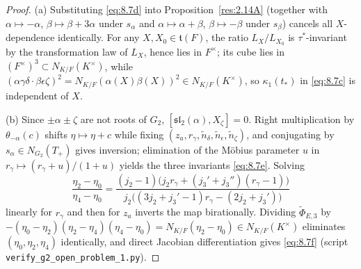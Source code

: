 \documentclass[12pt,letterpaper]{amsart}
\theoremstyle{plain}
\theoremstyle{definition}
\theoremstyle{remark}
\theoremstyle{definition}
\begin{document}
\begin{proof}
(a) Substituting \eqref{eq:8.7d} into Proposition~\ref{res:2.14A} (together with
$\alpha\mapsto-\alpha$, $\beta\mapsto\beta+3\alpha$ under $s_\alpha$ and
$\alpha\mapsto\alpha+\beta$, $\beta\mapsto-\beta$ under $s_\beta$) cancels all
$X$-dependence identically. For any $X,X_0\in\mathfrak t(F)$, the ratio
$L_X/L_{X_0}$ is $\tau^*$-invariant by the transformation law of $L_X$, hence
lies in $F^\times$; its cube lies in $(F^\times)^3\subset N_{K/F}(K^\times)$,
while $(\alpha\gamma\delta\cdot\beta\epsilon\zeta)^2=N_{K/F}(\alpha(X)\beta(X))^2
\in N_{K/F}(K^\times)$, so $\kappa_1(t_*)$ in \eqref{eq:8.7c} is independent of
$X$.

(b) Since $\pm\alpha\pm\zeta$ are not roots of $G_2$, $[\mathfrak{sl}_2(\alpha),X_\zeta]=0$.
Right multiplication by $\theta_{-\alpha}(c)$ shifts $\eta\mapsto\eta+c$ while
fixing $(z_a,r_\gamma,\tilde n_\delta,\tilde n_\epsilon,\tilde n_\zeta)$, and
conjugating by $s_\alpha\in N_{G_2}(T_+)$ gives inversion; elimination of the
M\"obius parameter $u$ in $r_\gamma\mapsto(r_\gamma+u)/(1+u)$ yields the three
invariants \eqref{eq:8.7e}. Solving
\[
\frac{\eta_2-\eta_0}{\eta_4-\eta_0}=\frac{(j_2-1)\bigl(j_2r_\gamma+(j_3'+j_3'')(r_\gamma-1)\bigr)}
{j_2\bigl((3j_2+j_3'-1)r_\gamma-(2j_2+j_3')\bigr)}
\]
linearly for $r_\gamma$ and then for
$z_a$ inverts the map birationally. Dividing $\tilde\Phi_{E,3}$ by
$-(\eta_0-\eta_2)(\eta_2-\eta_4)(\eta_4-\eta_0)=N_{K/F}(\eta_2-\eta_0)\in N_{K/F}(K^\times)$
eliminates $(\eta_0,\eta_2,\eta_4)$ identically, and direct Jacobian
differentiation gives \eqref{eq:8.7f} (script
\texttt{verify\_g2\_open\_problem\_1.py}).
\end{proof}
\end{document}
